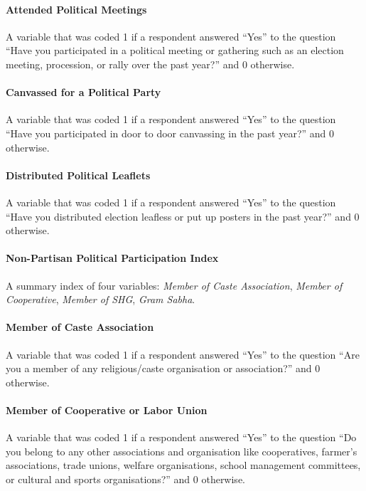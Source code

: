 \documentclass[hidelinks, 12pt, titlepage]{article}
\begin{document}
			\paragraph{Attended Political Meetings} A variable that was coded 1 if a respondent answered ``Yes'' to the question ``Have you participated in a political meeting or gathering such as an election meeting, procession, or rally over the past year?'' and 0 otherwise.

			\paragraph{Canvassed for a Political Party} A variable that was coded 1 if a respondent answered ``Yes'' to the question ``Have you participated in door to door canvassing in the past year?'' and 0 otherwise.

			\paragraph{Distributed Political Leaflets} A variable that was coded 1 if a respondent answered ``Yes'' to the question ``Have you distributed election leafless or put up posters in the past year?'' and 0 otherwise.

			\paragraph{Non-Partisan Political Participation Index}  A summary index of four variables: \emph{Member of Caste Association}, \emph{Member of Cooperative}, \emph{Member of SHG}, \emph{Gram Sabha}.

			\paragraph{Member of Caste Association} A variable that was coded 1 if a respondent answered ``Yes'' to the question ``Are you a member of any religious/caste organisation or association?'' and 0 otherwise.

			\paragraph{Member of Cooperative or Labor Union} A variable that was coded 1 if a respondent answered ``Yes'' to the question ``Do you belong to any other associations and organisation like cooperatives, farmer's associations, trade unions, welfare organisations, school management committees, or cultural and sports organisations?'' and 0 otherwise.
\end{document}
